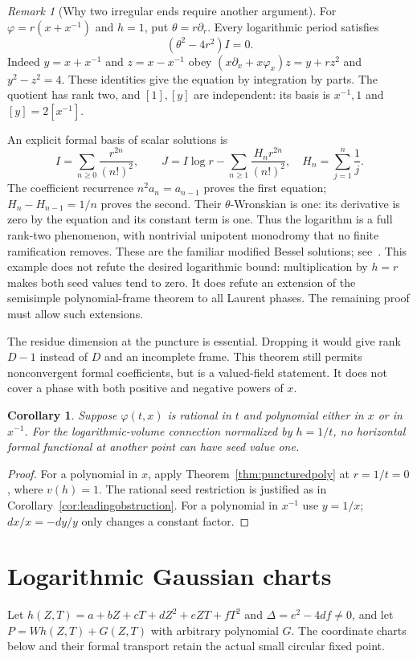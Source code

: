 \documentclass[11pt]{article}
\newtheorem{corollary}[theorem]{Corollary}
\theoremstyle{definition}\newtheorem{definition}[theorem]{Definition}
\theoremstyle{remark}\newtheorem{remark}[theorem]{Remark}
\begin{document}
\begin{remark}[Why two irregular ends require another argument]
For $\varphi=r(x+x^{-1})$ and $h=1$, put $\theta=r\partial_r$.
Every logarithmic period satisfies
\[
 (\theta^2-4r^2)I=0.
\]
Indeed $y=x+x^{-1}$ and $z=x-x^{-1}$ obey
$(x\partial_x+x\varphi_x)z=y+rz^2$ and $y^2-z^2=4$.
These identities give the equation by integration by parts.
The quotient has rank two, and $[1],[y]$ are independent:
its basis is $x^{-1},1$ and $[y]=2[x^{-1}]$.

An explicit formal basis of scalar solutions is
\[
 I=\sum_{n\geq0}\frac{r^{2n}}{(n!)^2},\qquad
 J=I\log r-\sum_{n\geq1}\frac{H_n r^{2n}}{(n!)^2},
 \quad H_n=\sum_{j=1}^n\frac1j.
\]
The coefficient recurrence $n^2a_n=a_{n-1}$ proves the first
equation; $H_n-H_{n-1}=1/n$ proves the second.
Their $\theta$-Wronskian is one: its derivative is zero by the
equation and its constant term is one. Thus the logarithm is a full
rank-two phenomenon, with nontrivial unipotent monodromy that no
finite ramification removes. These are the familiar modified Bessel
solutions; see~\cite[10.25.1, 10.31.2]{DLMF}.
This example does not refute the desired logarithmic bound:
multiplication by $h=r$ makes both seed values tend to zero.
It does refute an extension of the semisimple polynomial-frame theorem
to all Laurent phases. The remaining proof must allow such extensions.
\end{remark}

The residue dimension at the puncture is essential. Dropping it would
give rank $D-1$ instead of $D$ and an incomplete frame. This theorem
still permits nonconvergent formal coefficients, but is a valued-field
statement. It does not cover a phase with both positive and negative
powers of $x$.

\begin{corollary}\label{cor:oneend}
Suppose $\varphi(t,x)$ is rational in $t$ and polynomial either in
$x$ or in $x^{-1}$. For the logarithmic-volume connection normalized
by $h=1/t$, no horizontal formal functional at another point can have
seed value one.
\end{corollary}
\begin{proof}
For a polynomial in $x$, apply Theorem~\ref{thm:puncturedpoly} at
$r=1/t=0$, where $v(h)=1$. The rational seed restriction is justified
as in Corollary~\ref{cor:leadingobstruction}. For a polynomial in
$x^{-1}$ use $y=1/x$; $dx/x=-dy/y$ only changes a constant factor.
\end{proof}

\section{Logarithmic Gaussian charts}
Let $h(Z,T)=a+bZ+cT+dZ^2+eZT+fT^2$ and
$\Delta=e^2-4df\ne0$, and let $P=Wh(Z,T)+G(Z,T)$ with
arbitrary polynomial $G$. The coordinate charts below and their
formal transport retain the actual small circular fixed point.
\end{document}
